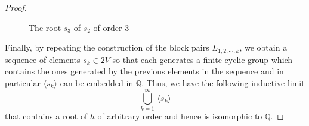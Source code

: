 \documentclass[10pt,a4paper]{amsart}
\begin{document}
\begin{proof}
\begin{figure}[htp]
\begin{center}
			\caption{The root  $s_3$  of  $s_2$  of order  $3$}
			\label{Fig:jthRoot}
		\end{center} 	
    	\end{figure} 
	
	Finally,  
	by repeating the construction of the block pairs $L_{1,2, \cdots, k}$,  
	we obtain a sequence of elements  $s_k \in 2V$ 
	so that each generates a finite cyclic group 
	which contains the ones generated by the previous elements in the sequence
	and in particular  $\langle s_k \rangle$  can be embedded in  $\mathbb{Q}$.
	Thus, 
	we have the following inductive limit 
	\begin{equation*} 
		\bigcup_{k = 1}^{\infty} \, \langle s_k \rangle 
	\end{equation*}
 	that contains a root of  $h$  of arbitrary order and hence    
	is isomorphic to  $\mathbb{Q}$.  
\end{proof}
\end{document}
